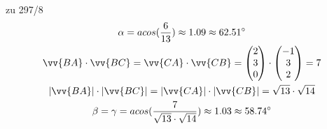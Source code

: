 \begin{exercise}{zu 297/8}
\begin{gather*}
    \alpha = acos(\frac{6}{13}) \approx 1.09 \approx 62.51^\circ \\
    \vv{BA} \cdot \vv{BC} = \vv{CA} \cdot \vv{CB} = \begin{pmatrix}2 \\ 3 \\ 0\end{pmatrix} \cdot \begin{pmatrix}-1 \\ 3 \\ 2\end{pmatrix} = 7 \\
    |\vv{BA}| \cdot |\vv{BC}| = |\vv{CA}| \cdot |\vv{CB}| = \sqrt{13} \cdot \sqrt{14} \\
    \beta = \gamma = acos(\frac{7}{\sqrt{13} \cdot \sqrt{14}}) \approx 1.03 \approx 58.74^\circ
  \end{gather*}
\end{exercise}
\newpage
